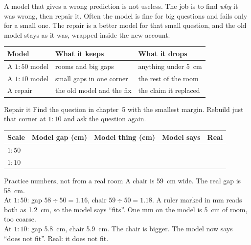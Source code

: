 \label{ch6}

A model that gives a wrong prediction is not useless. The job is to find \emph{why} it was wrong, then repair it. Often the model is fine for big questions and fails only for a small one. The repair is a better model for that small question, and the old model stays as it was, wrapped inside the new account.

\begin{center}
\sffamily\small\renewcommand{\arraystretch}{1.5}
\begin{tabular}{@{}p{3.4cm}p{3.7cm}p{3.7cm}@{}}
\toprule
\textbf{Model} & \textbf{What it keeps} & \textbf{What it drops}\\
\midrule
A $1:50$ model & rooms and big gaps & anything under 5~cm\\
A $1:10$ model & small gaps in one corner & the rest of the room\\
A repair & the old model and the fix & the claim it replaced\\
\bottomrule
\end{tabular}
\end{center}

\begin{tryit}{Repair it}
Find the question in chapter~5 with the smallest margin. Rebuild just that corner at $1:10$ and ask the question again.\par\medskip
\renewcommand{\arraystretch}{1.6}
\begin{tabular}{|l|c|c|c|c|}
\hline
\textbf{Scale} & \textbf{Model gap (cm)} & \textbf{Model thing (cm)} & \textbf{Model says} & \textbf{Real}\\ \hline
$1:50$ & & & & \\ \hline
$1:10$ & & & & \\ \hline
\end{tabular}
\end{tryit}

\begin{worked}{Practice numbers, not from a real room}
A chair is 59~cm wide. The real gap is 58~cm.\\
At $1:50$: gap $58\div50=1.16$, chair $59\div50=1.18$. A ruler marked in mm reads both as 1.2~cm, so the model says ``fits''. One mm on the model is 5~cm of room, too coarse.\\
At $1:10$: gap 5.8~cm, chair 5.9~cm. The chair is bigger. The model now says ``does not fit''. Real: it does not fit.
\end{worked}

